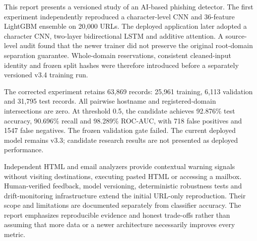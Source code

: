 This report presents a versioned study of an AI-based phishing detector. The first experiment independently reproduced a character-level CNN and 36-feature LightGBM ensemble on 20,000 URLs. The deployed application later adopted a character CNN, two-layer bidirectional LSTM and additive attention. A source-level audit found that the newer trainer did not preserve the original root-domain separation guarantee. Whole-domain reservations, consistent cleaned-input identity and frozen split hashes were therefore introduced before a separately versioned v3.4 training run.

The corrected experiment retains 63,869 records: 25,961 training, 6,113 validation and 31,795 test records. All pairwise hostname and registered-domain intersections are zero. At threshold 0.5, the candidate achieves 92.876\% test accuracy, 90.696\% recall and 98.289\% ROC-AUC, with 718 false positives and 1547 false negatives. The frozen validation gate failed. The current deployed model remains v3.3; candidate research results are not presented as deployed performance.

Independent HTML and email analyzers provide contextual warning signals without visiting destinations, executing pasted HTML or accessing a mailbox. Human-verified feedback, model versioning, deterministic robustness tests and drift-monitoring infrastructure extend the initial URL-only reproduction. Their scope and limitations are documented separately from classifier accuracy. The report emphasizes reproducible evidence and honest trade-offs rather than assuming that more data or a newer architecture necessarily improves every metric.